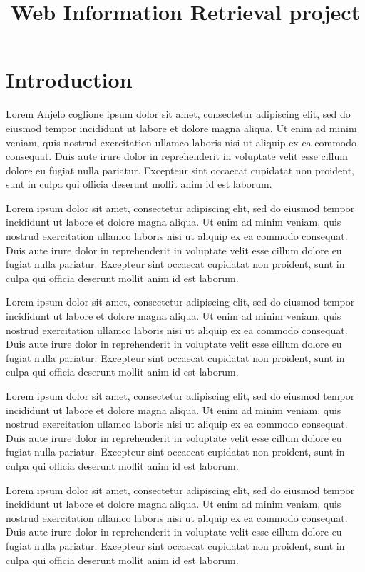 \documentclass[jou,apacite]{apa6}
\title{Web Information Retrieval project}
\begin{document}
\maketitle    
\section{Introduction}

Lorem Anjelo coglione ipsum dolor sit amet, consectetur adipiscing elit, sed do eiusmod tempor incididunt ut labore et dolore magna aliqua. Ut enim ad minim veniam, quis nostrud exercitation ullamco laboris nisi ut aliquip ex ea commodo consequat. Duis aute irure dolor in reprehenderit in voluptate velit esse cillum dolore eu fugiat nulla pariatur. Excepteur sint occaecat cupidatat non proident, sunt in culpa qui officia deserunt mollit anim id est laborum.

Lorem ipsum dolor sit amet, consectetur adipiscing elit, sed do eiusmod tempor incididunt ut labore et dolore magna aliqua. Ut enim ad minim veniam, quis nostrud exercitation ullamco laboris nisi ut aliquip ex ea commodo consequat. Duis aute irure dolor in reprehenderit in voluptate velit esse cillum dolore eu fugiat nulla pariatur. Excepteur sint occaecat cupidatat non proident, sunt in culpa qui officia deserunt mollit anim id est laborum.

Lorem ipsum dolor sit amet, consectetur adipiscing elit, sed do eiusmod tempor incididunt ut labore et dolore magna aliqua. Ut enim ad minim veniam, quis nostrud exercitation ullamco laboris nisi ut aliquip ex ea commodo consequat. Duis aute irure dolor in reprehenderit in voluptate velit esse cillum dolore eu fugiat nulla pariatur. Excepteur sint occaecat cupidatat non proident, sunt in culpa qui officia deserunt mollit anim id est laborum.

Lorem ipsum dolor sit amet, consectetur adipiscing elit, sed do eiusmod tempor incididunt ut labore et dolore magna aliqua. Ut enim ad minim veniam, quis nostrud exercitation ullamco laboris nisi ut aliquip ex ea commodo consequat. Duis aute irure dolor in reprehenderit in voluptate velit esse cillum dolore eu fugiat nulla pariatur. Excepteur sint occaecat cupidatat non proident, sunt in culpa qui officia deserunt mollit anim id est laborum.

Lorem ipsum dolor sit amet, consectetur adipiscing elit, sed do eiusmod tempor incididunt ut labore et dolore magna aliqua. Ut enim ad minim veniam, quis nostrud exercitation ullamco laboris nisi ut aliquip ex ea commodo consequat. Duis aute irure dolor in reprehenderit in voluptate velit esse cillum dolore eu fugiat nulla pariatur. Excepteur sint occaecat cupidatat non proident, sunt in culpa qui officia deserunt mollit anim id est laborum.
\end{document}
